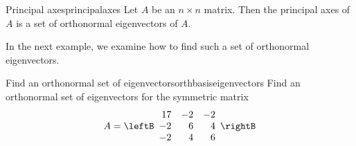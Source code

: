 \begin{definition}{Principal axes}{principalaxes}
Let $A$ be an $n \times n$ matrix. Then the principal axes of $A$ is a set of orthonormal eigenvectors of $A$.
\end{definition}

In the next example, we examine how to find such a set of orthonormal eigenvectors.

\begin{example}{Find an orthonormal set of eigenvectors}{orthbasiseigenvectors}
Find an orthonormal set of eigenvectors for the symmetric matrix
\begin{equation*}
A = \leftB
\begin{array}{rrr}
17 & -2 & -2 \\
-2 & 6 & 4 \\
-2 & 4 & 6
\end{array}
\rightB
\end{equation*}
\end{example}

